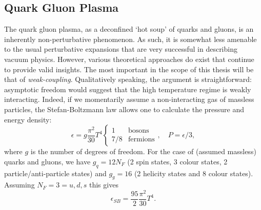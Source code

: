 \documentclass[11pt, a4paper, twoside]{book}
\begin{document}
\subsection{Quark Gluon Plasma}
\label{sec:QGP}
The quark gluon plasma, as a deconfined `hot soup' of quarks and gluons, is an inherently non-perturbative phenomenon. As such, it is somewhat less amenable to the usual perturbative expansions that are very successful in describing vacuum physics. However, various theoretical approaches do exist that continue to provide valid insights. The most important in the scope of this thesis will be that of \emph{weak-coupling}. Qualitatively speaking, the argument is straightforward: asymptotic freedom would suggest that the high temperature regime is weakly interacting. Indeed, if we momentarily assume a non-interacting gas of massless particles, the Stefan-Boltzmann law allows one to calculate the pressure and energy density:
\begin{equation}
\label{eq:SBres}
\epsilon=g\frac{\pi^2}{30}T^4\begin{cases}
    1 & \text{bosons}\\
    7/8 & \text{fermions}
  \end{cases},\quad P=\epsilon/3,
\end{equation}
where \(g\) is the number of degrees of freedom. For the case of (assumed massless) quarks and gluons, we have \(g_q=12N_F\) (2 spin states, 3 colour states, 2 particle/anti-particle states) and \(g_g=16\) (2 helicity states and 8 colour states). Assuming \(N_F=3=u,d,s\) this gives
\begin{equation}
\label{eq:SB_pres}
\epsilon_{SB}=\frac{95}{2}\frac{\pi^2}{30}T^4.
\end{equation}
\end{document}

